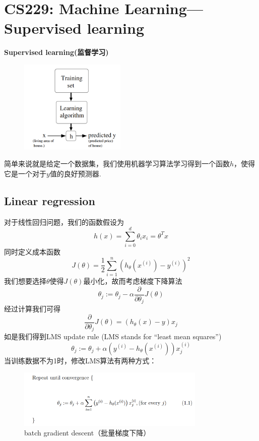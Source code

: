 \documentclass[12pt, a4paper, oneside]{ctexbook}
\begin{document}
\chapter{CS229: Machine Learning---Supervised learning}

\textbf{Supervised learning(监督学习)}

  \begin{figure}[h]
		\centering 
		\includegraphics[width=0.45\textwidth]{images18.png} 
	\end{figure}

简单来说就是给定一个数据集，我们使用机器学习算法学习得到一个函数$h$，使得它是一个对于$y$值的良好预测器.

\section{Linear regression}

对于线性回归问题，我们的函数假设为\[h(x)=\sum_{i=0}^{d} \theta_i x_i=\theta^{T}x\]同时定义成本函数\[J(\theta)=\dfrac{1}{2}\sum_{i=1}^{n}(h_{\theta}(x^{(i)})-y^{(i)})^2\]我们想要选择$\theta$使得$J(\theta)$最小化，故而考虑梯度下降算法\[\theta_{j}:=\theta_{j}-\alpha \dfrac{\partial}{\partial \theta_{j}}J(\theta)\]经过计算我们可得\[\dfrac{\partial}{\partial \theta_{j}}J(\theta)=(h_{\theta}(x)-y)x_j\]如是我们得到LMS update rule (LMS stands for “least mean squares”) \[\theta_{j}:=\theta_{j}+\alpha (y^{(i)}-h_{\theta}(x^{(i)}))x_j^{(i)}\]当训练数据不为1时，修改LMS算法有两种方式：

  \begin{figure}[h]
		\centering 
		\includegraphics[width=0.8\textwidth]{images19.png} 
		\caption{batch gradient descent（批量梯度下降）}
	\end{figure}
\end{document}
